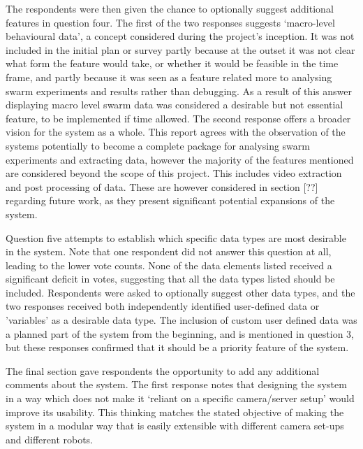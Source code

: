 The respondents were then given the chance to optionally suggest additional features in question four. The first of the two responses suggests `macro-level behavioural data', a concept considered during the project's inception. It was not included in the initial plan or survey partly because at the outset it was not clear what form the feature would take, or whether it would be feasible in the time frame, and partly because it was seen as a feature related more to analysing swarm experiments and results rather than debugging. As a result of this answer displaying macro level swarm data was considered a desirable but not essential feature, to be implemented if time allowed. The second response offers a broader vision for the system as a whole. This report agrees with the observation of the systems potentially to become a complete package for analysing swarm experiments and extracting data, however the majority of the features mentioned are considered beyond the scope of this project. This includes video extraction and post processing of data. These are however considered in section [??] regarding future work, as they present significant potential expansions of the system.

Question five attempts to establish which specific data types are most desirable in the system. Note that one respondent did not answer this question at all, leading to the lower vote counts. None of the data elements listed received a significant deficit in votes, suggesting that all the data types listed should be included. Respondents were asked to optionally suggest other data types, and the two responses received both independently identified user-defined data or 'variables' as a desirable data  type. The inclusion of custom user defined data was a planned part of the system from the beginning, and is mentioned in question 3, but these responses confirmed that it should be a priority feature of the system.

The final section gave respondents the opportunity to add any additional comments about the system. The first response notes that designing the system in a way which does not make it `reliant on a specific camera/server setup' would improve its usability. This thinking matches the stated objective of making the system in a modular way that is easily extensible with different camera set-ups and different robots.


